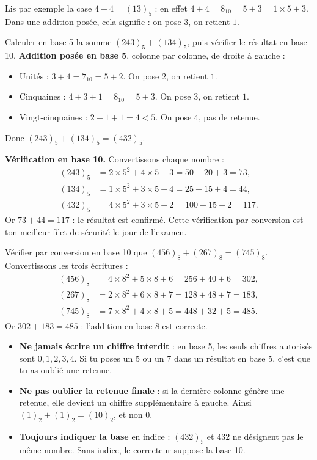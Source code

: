 \documentclass[11pt]{article}
\begin{document}
Lis par exemple la case $4 + 4 = (13)_5$ : en effet $4 + 4 = 8_{10} = 5 + 3 = 1 \times 5 + 3$. Dans une addition posée, cela signifie : on pose $3$, on retient $1$.

\begin{exoresolu}
Calculer en base 5 la somme $(243)_5 + (134)_5$, puis vérifier le résultat en base 10.
\tcblower
\textbf{Addition posée en base 5}, colonne par colonne, de droite à gauche :
\begin{itemize}
\item Unités : $3 + 4 = 7_{10} = 5 + 2$. On pose $2$, on retient $1$.
\item Cinquaines : $4 + 3 + 1 = 8_{10} = 5 + 3$. On pose $3$, on retient $1$.
\item Vingt-cinquaines : $2 + 1 + 1 = 4 < 5$. On pose $4$, pas de retenue.
\end{itemize}
Donc $(243)_5 + (134)_5 = (432)_5$.

\textbf{Vérification en base 10.} Convertissons chaque nombre :
\begin{align*}
(243)_5 &= 2 \times 5^2 + 4 \times 5 + 3 = 50 + 20 + 3 = 73,\\
(134)_5 &= 1 \times 5^2 + 3 \times 5 + 4 = 25 + 15 + 4 = 44,\\
(432)_5 &= 4 \times 5^2 + 3 \times 5 + 2 = 100 + 15 + 2 = 117.
\end{align*}
Or $73 + 44 = 117$ : le résultat est confirmé. Cette vérification par conversion est ton meilleur filet de sécurité le jour de l'examen.
\end{exoresolu}

\begin{exoresolu}
Vérifier par conversion en base 10 que $(456)_8 + (267)_8 = (745)_8$.
\tcblower
Convertissons les trois écritures :
\begin{align*}
(456)_8 &= 4 \times 8^2 + 5 \times 8 + 6 = 256 + 40 + 6 = 302,\\
(267)_8 &= 2 \times 8^2 + 6 \times 8 + 7 = 128 + 48 + 7 = 183,\\
(745)_8 &= 7 \times 8^2 + 4 \times 8 + 5 = 448 + 32 + 5 = 485.
\end{align*}
Or $302 + 183 = 485$ : l'addition en base 8 est correcte.
\end{exoresolu}

\begin{attention}
\begin{itemize}
\item \textbf{Ne jamais écrire un chiffre interdit} : en base 5, les seuls chiffres autorisés sont $0, 1, 2, 3, 4$. Si tu poses un $5$ ou un $7$ dans un résultat en base 5, c'est que tu as oublié une retenue.
\item \textbf{Ne pas oublier la retenue finale} : si la dernière colonne génère une retenue, elle devient un chiffre supplémentaire à gauche. Ainsi $(1)_2 + (1)_2 = (10)_2$, et non $0$.
\item \textbf{Toujours indiquer la base} en indice : $(432)_5$ et $432$ ne désignent pas le même nombre. Sans indice, le correcteur suppose la base 10.
\end{itemize}
\end{attention}
\end{document}
